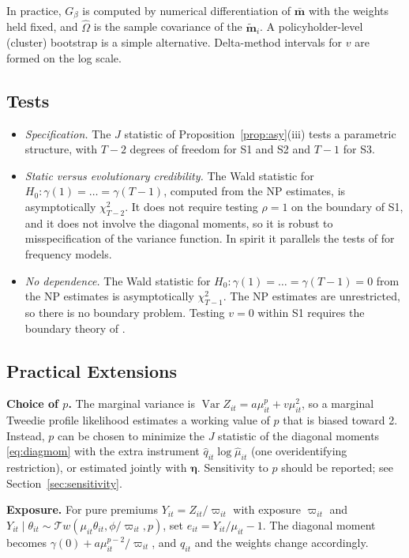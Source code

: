 \documentclass[mathematics,article,submit,moreauthors]{Definitions/mdpi}
\DeclareMathOperator{\Var}{Var}
\newcommand{\Tw}{\mathcal{T}w}
\newcommand{\boeta}{\boldsymbol{\eta}}
\begin{document}
In practice, $G_\beta$ is computed by numerical differentiation of $\bar{\boldsymbol m}$ with the weights held fixed, and $\widehat\Omega$ is the sample covariance of the $\tilde{\boldsymbol m}_i$. A policyholder-level (cluster) bootstrap is a simple alternative. Delta-method intervals for $v$ are formed on the log scale.

\subsection{Tests}\label{sec:tests}

\begin{itemize}
\item \emph{Specification.} The $J$ statistic of Proposition~\ref{prop:asy}(iii) tests a parametric structure, with $T-2$ degrees of freedom for S1 and S2 and $T-1$ for S3.
\item \emph{Static versus evolutionary credibility.} The Wald statistic for $H_0:\gamma(1)=\dots=\gamma(T-1)$, computed from the NP estimates, is asymptotically $\chi^2_{T-2}$. It does not require testing $\rho=1$ on the boundary of S1, and it does not involve the diagonal moments, so it is robust to misspecification of the variance function. In spirit it parallels the tests of \citet{bolance2003} for frequency models.
\item \emph{No dependence.} The Wald statistic for $H_0:\gamma(1)=\dots=\gamma(T-1)=0$ from the NP estimates is asymptotically $\chi^2_{T-1}$. The NP estimates are unrestricted, so there is no boundary problem. Testing $v=0$ within S1 requires the boundary theory of \citet{andrews1999}.
\end{itemize}

\subsection{Practical Extensions}\label{sec:practical}

\textbf{Choice of $p$.} The marginal variance is $\Var Z_{it}=a\mu_{it}^p+v\mu_{it}^2$, so a marginal Tweedie profile likelihood estimates a working value of $p$ that is biased toward 2. Instead, $p$ can be chosen to minimize the $J$ statistic of the diagonal moments \eqref{eq:diagmom} with the extra instrument $\hat q_{it}\log\hat\mu_{it}$ (one overidentifying restriction), or estimated jointly with $\boeta$. Sensitivity to $p$ should be reported; see Section~\ref{sec:sensitivity}.

\textbf{Exposure.} For pure premiums $Y_{it}=Z_{it}/\varpi_{it}$ with exposure $\varpi_{it}$ and $Y_{it}\mid\theta_{it}\sim\Tw(\mu_{it}\theta_{it},\phi/\varpi_{it},p)$, set $e_{it}=Y_{it}/\mu_{it}-1$. The diagonal moment becomes $\gamma(0)+a\mu_{it}^{p-2}/\varpi_{it}$, and $q_{it}$ and the weights change accordingly.
\end{document}

